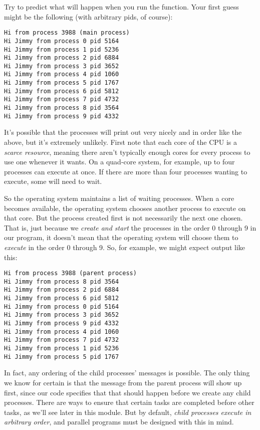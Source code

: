 \documentclass[letterpaper,10pt,openany,oneside]{sphinxmanual}
\begin{document}
Try to predict what will happen when you run the  function. Your first guess might be the following
(with arbitrary pids, of course):

\begin{Verbatim}[commandchars=\\\{\}]
Hi from process 3988 (main process)
Hi Jimmy from process 0 pid 5164
Hi Jimmy from process 1 pid 5236
Hi Jimmy from process 2 pid 6884
Hi Jimmy from process 3 pid 3652
Hi Jimmy from process 4 pid 1060
Hi Jimmy from process 5 pid 1767
Hi Jimmy from process 6 pid 5812
Hi Jimmy from process 7 pid 4732
Hi Jimmy from process 8 pid 3564
Hi Jimmy from process 9 pid 4332
\end{Verbatim}

It’s possible that the processes will print out very nicely and in order
like the above, but it’s extremely unlikely. First note that each core
of the CPU is a \emph{scarce resource}, meaning there aren’t typically enough
cores for every process to use one whenever it wants. On a quad-core
system, for example, up to four processes can execute at once. If there
are more than four processes wanting to execute, some will need to wait.

So the operating system maintains a list of waiting processes. When a
core becomes available, the operating system chooses another process to
execute on that core. But the process created first is not necessarily
the next one chosen. That is, just because we \emph{create and start} the
processes in the order 0 through 9 in our program, it doesn’t mean that
the operating system will choose them to \emph{execute} in the order 0
through 9. So, for example, we might expect output like this:

\begin{Verbatim}[commandchars=\\\{\}]
Hi from process 3988 (parent process)
Hi Jimmy from process 8 pid 3564
Hi Jimmy from process 2 pid 6884
Hi Jimmy from process 6 pid 5812
Hi Jimmy from process 0 pid 5164
Hi Jimmy from process 3 pid 3652
Hi Jimmy from process 9 pid 4332
Hi Jimmy from process 4 pid 1060
Hi Jimmy from process 7 pid 4732
Hi Jimmy from process 1 pid 5236
Hi Jimmy from process 5 pid 1767
\end{Verbatim}

In fact, any ordering of the child processes’ messages is possible. The
only thing we know for certain is that the message from the parent
process will show up first, since our code specifies that that should
happen before we create any child processes. There are ways to ensure
that certain tasks are completed before other tasks, as we’ll see later
in this module. But by default,
\emph{child processes execute in arbitrary order}, and parallel programs must be designed with this in mind.
\end{document}
